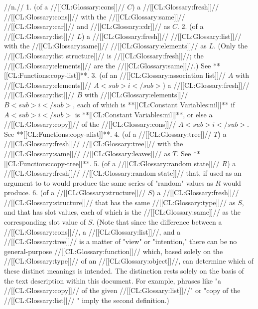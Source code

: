  //n.// 1. (of a //[[CL:Glossary:cons]]// $C$) a //[[CL:Glossary:fresh]]// //[[CL:Glossary:cons]]// with the //[[CL:Glossary:same]]// //[[CL:Glossary:car]]// and //[[CL:Glossary:cdr]]// as $C$. 2. (of a //[[CL:Glossary:list]]// $L$) a //[[CL:Glossary:fresh]]// //[[CL:Glossary:list]]// with the //[[CL:Glossary:same]]// //[[CL:Glossary:elements]]// as $L$. (Only the //[[CL:Glossary:list structure]]// is //[[CL:Glossary:fresh]]//; the //[[CL:Glossary:elements]]// are the //[[CL:Glossary:same]]//.) See **[[CL:Functions:copy-list]]**. 3. (of an //[[CL:Glossary:association list]]// $A$ with //[[CL:Glossary:elements]]// $A<sub>i</sub>$) a //[[CL:Glossary:fresh]]// //[[CL:Glossary:list]]// $B$ with //[[CL:Glossary:elements]]// $B<sub>i</sub>$, each of which is **[[CL:Constant Variables:nil]]** if $A<sub>i</sub>$ is **[[CL:Constant Variables:nil]]**, or else a //[[CL:Glossary:copy]]// of the //[[CL:Glossary:cons]]// $A<sub>i</sub>$. See **[[CL:Functions:copy-alist]]**. 4. (of a //[[CL:Glossary:tree]]// $T$) a //[[CL:Glossary:fresh]]// //[[CL:Glossary:tree]]// with the //[[CL:Glossary:same]]// //[[CL:Glossary:leaves]]// as $T$. See **[[CL:Functions:copy-tree]]**. 5. (of a //[[CL:Glossary:random state]]// $R$) a //[[CL:Glossary:fresh]]// //[[CL:Glossary:random state]]// that, if used as an argument to to  would produce the same series of "random" values as $R$ would produce.
 6. (of a //[[CL:Glossary:structure]]// $S$) a //[[CL:Glossary:fresh]]// //[[CL:Glossary:structure]]// that has the same //[[CL:Glossary:type]]// as $S$, and that has slot values, each of which is the //[[CL:Glossary:same]]// as the corresponding slot value of $S$. (Note that since the difference between a //[[CL:Glossary:cons]]//, a //[[CL:Glossary:list]]//, and a //[[CL:Glossary:tree]]// is a matter of "view" or "intention," there can be no general-purpose //[[CL:Glossary:function]]// which, based solely on the //[[CL:Glossary:type]]// of an //[[CL:Glossary:object]]//, can determine which of these distinct meanings is intended. The distinction rests solely on the basis of the text description within this document. For example, phrases like "a //[[CL:Glossary:copy]]// of the given //[[CL:Glossary:list]]//" or "copy of the //[[CL:Glossary:list]]// " imply the second definition.)

